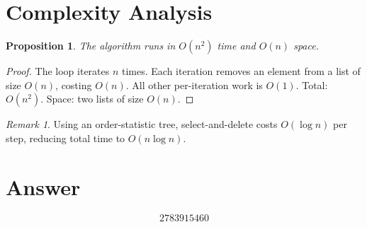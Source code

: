 \documentclass[12pt,a4paper]{article}
\newtheorem{proposition}[theorem]{Proposition}
\theoremstyle{definition}
\theoremstyle{remark}
\newtheorem*{remark}{Remark}
\begin{document}
\section{Complexity Analysis}

\begin{proposition}
The algorithm runs in $O(n^2)$ time and $O(n)$ space.
\end{proposition}

\begin{proof}
The loop iterates $n$ times. Each iteration removes an element from a list of size $O(n)$, costing $O(n)$. All other per-iteration work is $O(1)$. Total: $O(n^2)$. Space: two lists of size $O(n)$.
\end{proof}

\begin{remark}
Using an order-statistic tree, select-and-delete costs $O(\log n)$ per step, reducing total time to $O(n \log n)$.
\end{remark}

\section{Answer}

\[
\boxed{2783915460}
\]
\end{document}
